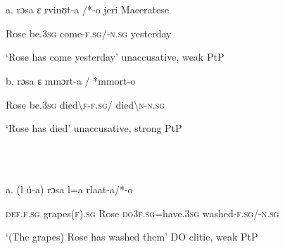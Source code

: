 \documentclass[output=paper]{langscibook}
\begin{document}
\begin{styleTabellaLUNGA}
\ea%
    \label{ex:key:22}
    \gll \\
         \\
    \glt
    \z %

          a.  rɔsa   ɛ     rvinʊt-a  /*-o   jeri            Maceratese
\end{styleTabellaLUNGA}

\begin{styleTabellaLUNGA}
    Rose   be.3\textsc{sg}   come-\textsc{f.sg}/-\textsc{n.sg}  yesterday          
\end{styleTabellaLUNGA}

\begin{styleTabellaLUNGA}
    ‘Rose has come yesterday’               unaccusative, weak PtP
\end{styleTabellaLUNGA}

\begin{styleTabellaLUNGA}
  b.  rɔsa   ɛ   mmɔrt-a  /  *mmort-o         
\end{styleTabellaLUNGA}

\begin{styleTabellaLUNGA}
    Rose   be.3\textsc{sg}   died{\textbackslash}\textsc{f}{}-\textsc{f.sg}/  died{\textbackslash}\textsc{n}{}-\textsc{n.sg}
\end{styleTabellaLUNGA}

\begin{styleTabellaLUNGA}
    ‘Rose has died’                     unaccusative, strong PtP
\end{styleTabellaLUNGA}

\begin{styleTabellaLUNGA}
\ea%
    \label{ex:key:23}
    \gll \\
         \\
    \glt
    \z %

          a.  (l     ú-a)       rɔsa     l=a         rlaat-a/*-o 
\end{styleTabellaLUNGA}

\begin{styleTabellaLUNGA}
    \textsc{def.f.sg}  grapes(\textsc{f}).\textsc{sg}   Rose  \textsc{do3f.sg}=have.3\textsc{sg}    washed-\textsc{f.sg}/-\textsc{n.sg}
\end{styleTabellaLUNGA}

\begin{styleTabellaLUNGA}
    ‘(The grapes) Rose has washed them’         DO clitic, weak PtP
\end{styleTabellaLUNGA}
\end{document}
